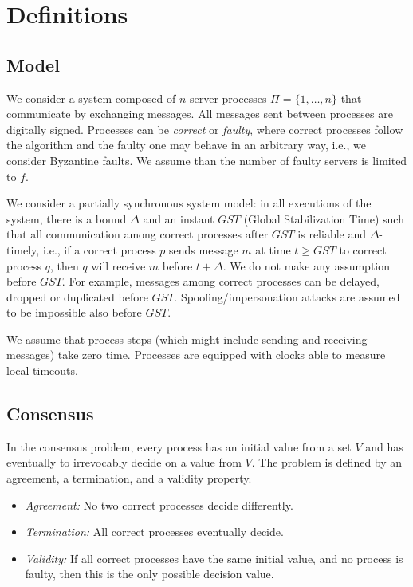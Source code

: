 \section{Definitions}
\label{sec:definitions}


\subsection{Model}

We consider a system composed of $n$ server processes $\Pi = \{ 1, \dots, n\}$ that communicate by exchanging messages.
All messages sent between processes are digitally signed.
Processes can be \emph{correct} or \emph{faulty}, where correct processes
follow the algorithm and the faulty one may behave in an arbitrary way, i.e., we consider Byzantine faults.
We assume than the number of faulty servers is limited to $f$.

We consider a partially synchronous system model:
in all executions of the system, there is a bound $\Delta$
and an instant $GST$ (Global Stabilization Time) such that all
communication among correct processes after $GST$ is reliable and $\Delta$-timely, i.e., if a correct process
$p$ sends message $m$ at time $t\ge GST$ to correct process $q$, then $q$ will receive $m$
before $t+\Delta$.
We do not make any assumption
before $GST$. For example, messages among correct processes can be
delayed, dropped or duplicated before $GST$. Spoofing/impersonation attacks are
assumed to be impossible also before $GST$.

We assume that process steps (which might include
sending and receiving messages)
take zero time.
Processes are equipped with clocks able to measure local timeouts.

 \subsection{Consensus}
 \label{sec:consensus}

 \newcommand{\propose}{\mathsf{Propose}}
 \newcommand{\decide}{\mathsf{Decide}}

 In the consensus problem, every process has an initial value from a
      set $V$ and has eventually to irrevocably decide on a value from
      $V$.
 The problem is defined by an agreement, a termination, and a validity
      property.

 \begin{itemize}
 \item \emph{Agreement:} No two correct processes decide differently.
 \item \emph{Termination:} All correct processes eventually decide.
 \item \emph{Validity:} If all correct processes have the same initial value, and no process
 is faulty, then this is the only possible decision value.
 \end{itemize}
